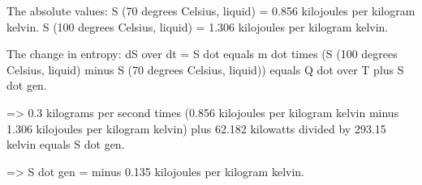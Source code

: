 The absolute values:  
S (70 degrees Celsius, liquid) = 0.856 kilojoules per kilogram kelvin.  
S (100 degrees Celsius, liquid) = 1.306 kilojoules per kilogram kelvin.  

The change in entropy:  
dS over dt = S dot equals m dot times (S (100 degrees Celsius, liquid) minus S (70 degrees Celsius, liquid)) equals Q dot over T plus S dot gen.  

=> 0.3 kilograms per second times (0.856 kilojoules per kilogram kelvin minus 1.306 kilojoules per kilogram kelvin) plus 62.182 kilowatts divided by 293.15 kelvin equals S dot gen.  

=> S dot gen = minus 0.135 kilojoules per kilogram kelvin.